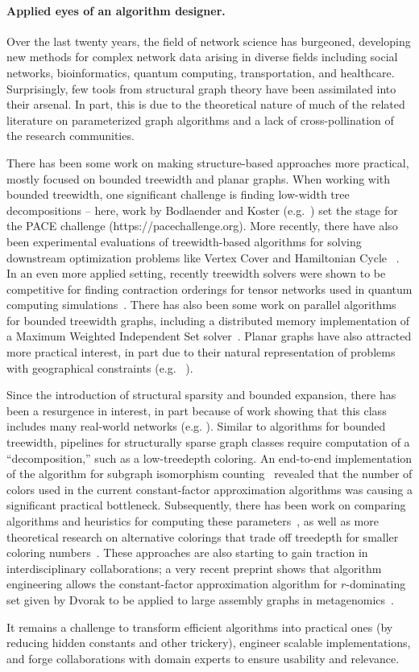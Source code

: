 \paragraph*{Applied eyes of an algorithm designer.}

Over the last twenty years, the field of network science
has burgeoned, developing new methods for complex network data arising
in diverse fields including social networks, bioinformatics, quantum computing,
transportation, and healthcare. Surprisingly, few tools from structural graph theory have been assimilated into
their arsenal. In part, this is due to the theoretical nature of
much of the related literature on parameterized graph algorithms
and a lack of cross-pollination of the research
communities.

There has been some work on making structure-based approaches more practical, mostly focused on
bounded treewidth and planar graphs. When working with bounded treewidth, one significant
challenge is finding low-width tree decompositions -- here, work by Bodlaender and Koster (e.g.~\cite{bodlaender2006-tw, koster2001-tw})
set the stage for the PACE challenge (https://pacechallenge.org). More recently, there have also been
experimental evaluations of treewidth-based algorithms for solving downstream optimization problems like
Vertex Cover and Hamiltonian Cycle ~\cite{ziobro2018hamcycle-tw, alber2005vc-tw}. In an even more
applied setting, recently treewidth solvers were shown to be competitive for finding contraction orderings
for tensor networks used in quantum computing simulations~\cite{dumitrescu2018tensors}. There has also been some
work on parallel algorithms for bounded treewidth graphs, including a distributed memory implementation of a
Maximum Weighted Independent Set solver~\cite{sullivan2013paralleltd}.
Planar graphs have also attracted more practical interest, in part due to their natural representation of problems with geographical
constraints (e.g. ~\cite{alber2001-planar, schmidt2009-planarvision}).

Since the introduction of structural sparsity and bounded expansion,
there has been a resurgence in interest, in part because of work showing that
this class includes many real-world networks (e.g. \cite{demaine2018sparsity}).
Similar to algorithms for bounded treewidth, pipelines for structurally sparse graph classes
require computation of a ``decomposition,'' such as a low-treedepth coloring. An end-to-end implementation
of the algorithm for subgraph isomorphism counting~\cite{obrien2017concuss} revealed that the
number of colors used in the current constant-factor approximation algorithms was causing a significant
practical bottleneck. Subsequently, there has been work on comparing algorithms and heuristics
for computing these parameters~\cite{wojciech2018quasiwide}, as well as more theoretical research
on alternative colorings that trade off treedepth for smaller coloring numbers~\cite{kun2018lincolor}.
These approaches are also starting to gain traction in interdisciplinary collaborations; a very recent
preprint shows that algorithm engineering allows the constant-factor approximation algorithm
for $r$-dominating set given by Dvorak to be applied to large assembly graphs in metagenomics~\cite{brown2018metagenome}.

It remains a challenge to transform efficient algorithms into practical ones (by reducing hidden constants and other trickery),
engineer scalable implementations, and forge collaborations with domain experts to ensure usability and relevance.

